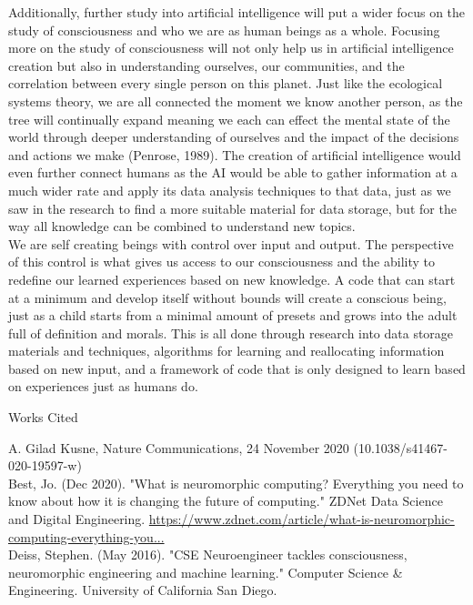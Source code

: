 \documentclass[11pt]{article}
\theoremstyle{plain}
\begin{document}
Additionally, further study into artificial intelligence will put a wider focus on the study of consciousness and who we are as human beings as a whole. Focusing more on the study of consciousness will not only help us in artificial intelligence creation but also in understanding ourselves, our communities, and the correlation between every single person on this planet. Just like the ecological systems theory, we are all connected the moment we know another person, as the tree will continually expand meaning we each can effect the mental state of the world through deeper understanding of ourselves and the impact of the decisions and actions we make (Penrose, 1989). The creation of artificial intelligence would even further connect humans as the AI would be able to gather information at a much wider rate and apply its data analysis techniques to that data, just as we saw in the research to find a more suitable material for data storage, but for the way all knowledge can be combined to understand new topics. \\

We are self creating beings with control over input and output. The perspective of this control is what gives us access to our consciousness and the ability to redefine our learned experiences based on new knowledge. A code that can start at a minimum and develop itself without bounds will create a conscious being, just as a child starts from a minimal amount of presets and grows into the adult full of definition and morals. This is all done through research into data storage materials and techniques, algorithms for learning and reallocating information based on new input, and a framework of code that is only designed to learn based on experiences just as humans do. \\




\pagebreak
\centerline{Works Cited}

\vspace{5mm}

A. Gilad Kusne, Nature Communications, 24 November 2020 (10.1038/s41467-020-19597-w)\\

Best, Jo. (Dec 2020). "What is neuromorphic computing? Everything you need to know about how it is changing the future of computing." ZDNet Data Science and Digital Engineering. \url{https://www.zdnet.com/article/what-is-neuromorphic-computing-everything-you...}\\

Deiss, Stephen. (May 2016). "CSE Neuroengineer tackles consciousness, neuromorphic engineering and machine learning." Computer Science \& Engineering. University of California San Diego. \\
\end{document}

